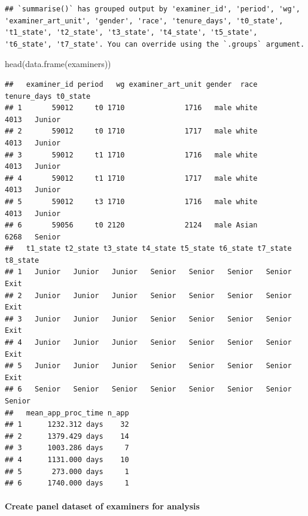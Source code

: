 \documentclass[
]{article}
\newenvironment{Shaded}{\begin{snugshade}}{\end{snugshade}}
\newcommand{\FunctionTok}[1]{\textcolor[rgb]{0.00,0.00,0.00}{#1}}
\newcommand{\NormalTok}[1]{#1}
\begin{document}
\begin{verbatim}
## `summarise()` has grouped output by 'examiner_id', 'period', 'wg', 'examiner_art_unit', 'gender', 'race', 'tenure_days', 't0_state', 't1_state', 't2_state', 't3_state', 't4_state', 't5_state', 't6_state', 't7_state'. You can override using the `.groups` argument.
\end{verbatim}

\begin{Shaded}
\begin{Highlighting}[]
\FunctionTok{head}\NormalTok{(}\FunctionTok{data.frame}\NormalTok{(examiners))}
\end{Highlighting}
\end{Shaded}

\begin{verbatim}
##   examiner_id period   wg examiner_art_unit gender  race tenure_days t0_state
## 1       59012     t0 1710              1716   male white        4013   Junior
## 2       59012     t0 1710              1717   male white        4013   Junior
## 3       59012     t1 1710              1716   male white        4013   Junior
## 4       59012     t1 1710              1717   male white        4013   Junior
## 5       59012     t3 1710              1716   male white        4013   Junior
## 6       59056     t0 2120              2124   male Asian        6268   Senior
##   t1_state t2_state t3_state t4_state t5_state t6_state t7_state t8_state
## 1   Junior   Junior   Junior   Senior   Senior   Senior   Senior     Exit
## 2   Junior   Junior   Junior   Senior   Senior   Senior   Senior     Exit
## 3   Junior   Junior   Junior   Senior   Senior   Senior   Senior     Exit
## 4   Junior   Junior   Junior   Senior   Senior   Senior   Senior     Exit
## 5   Junior   Junior   Junior   Senior   Senior   Senior   Senior     Exit
## 6   Senior   Senior   Senior   Senior   Senior   Senior   Senior   Senior
##   mean_app_proc_time n_app
## 1      1232.312 days    32
## 2      1379.429 days    14
## 3      1003.286 days     7
## 4      1131.000 days    10
## 5       273.000 days     1
## 6      1740.000 days     1
\end{verbatim}

\hypertarget{create-panel-dataset-of-examiners-for-analysis}{%
\paragraph{Create panel dataset of examiners for
analysis}\label{create-panel-dataset-of-examiners-for-analysis}}
\end{document}
